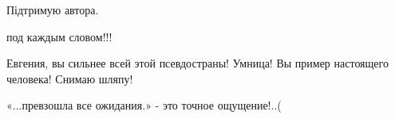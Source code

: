 \begin{itemize}
Підтримую автора.

 
под каждым словом!!!

 
Евгения, вы сильнее всей этой псевдостраны! Умница! Вы пример настоящего человека! Снимаю шляпу!

 
«...превзошла все ожидания.» - это точное ощущение!..(

\end{itemize}


